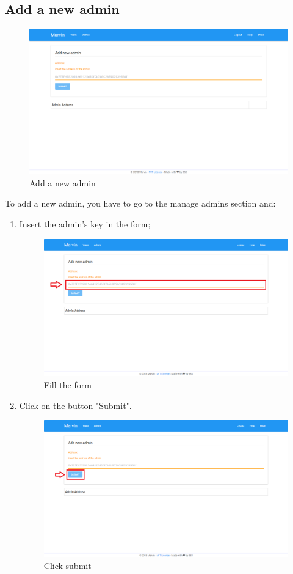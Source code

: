\documentclass[ManualeUtente]{subfiles}
\begin{document}
\subsection{Add a new admin}
\begin{figure}[H]
	\centering
	\includegraphics[width=0.7\linewidth]{image/UniversityAddAmin}
	\caption[Add admin]{Add a new admin}
	\label{fig:Add a new admin}
\end{figure}
To add a new admin, you have to go to the manage admins section and:
\begin{enumerate}
	\item Insert the admin's key in the form;
	\begin{figure}[H]
		\centering
		\includegraphics[width=0.7\linewidth]{image/UniversityAddAmin1}
		\caption[Add admin form]{Fill the form}
		\label{fig:Add a new admin, fill the form}
	\end{figure}
	\item Click on the button "Submit".
	\begin{figure}[H]
		\centering
		\includegraphics[width=0.7\linewidth]{image/UniversityAddAmin2}
		\caption[Add admin submit]{Click submit}
		\label{fig:Add a new admin, click submit}
	\end{figure}
\end{enumerate}
\end{document}
